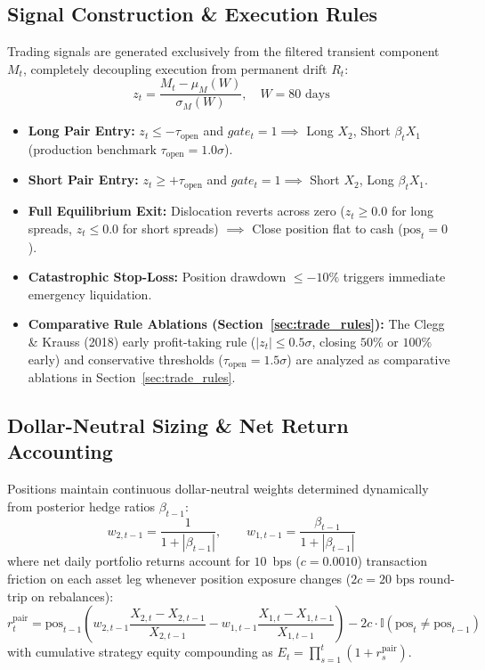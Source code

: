 \documentclass[11pt, a4paper]{article}
\begin{document}
\subsection{Signal Construction \& Execution Rules}
Trading signals are generated exclusively from the filtered transient component $M_t$, completely decoupling execution from permanent drift $R_t$:
\begin{equation}
    z_t = \frac{M_t - \mu_M(W)}{\sigma_M(W)}, \quad W = 80\text{ days}
\end{equation}
\begin{itemize}
    \item \textbf{Long Pair Entry:} $z_t \le -\tau_{\text{open}}$ and $gate_t = 1 \implies$ Long $X_2$, Short $\beta_t X_1$ (production benchmark $\tau_{\text{open}} = 1.0\sigma$).
    \item \textbf{Short Pair Entry:} $z_t \ge +\tau_{\text{open}}$ and $gate_t = 1 \implies$ Short $X_2$, Long $\beta_t X_1$.
    \item \textbf{Full Equilibrium Exit:} Dislocation reverts across zero ($z_t \ge 0.0$ for long spreads, $z_t \le 0.0$ for short spreads) $\implies$ Close position flat to cash ($\text{pos}_t = 0$).
    \item \textbf{Catastrophic Stop-Loss:} Position drawdown $\le -10\%$ triggers immediate emergency liquidation.
    \item \textbf{Comparative Rule Ablations (Section~\ref{sec:trade_rules}):} The Clegg \& Krauss (2018) early profit-taking rule ($|z_t| \le 0.5\sigma$, closing $50\%$ or $100\%$ early) and conservative thresholds ($\tau_{\text{open}} = 1.5\sigma$) are analyzed as comparative ablations in Section~\ref{sec:trade_rules}.
\end{itemize}

\subsection{Dollar-Neutral Sizing \& Net Return Accounting}
Positions maintain continuous dollar-neutral weights determined dynamically from posterior hedge ratios $\beta_{t-1}$:
\begin{equation}
    w_{2,t-1} = \frac{1}{1 + |\beta_{t-1}|}, \qquad w_{1,t-1} = \frac{\beta_{t-1}}{1 + |\beta_{t-1}|}
\end{equation}
where net daily portfolio returns account for $10$~bps ($c = 0.0010$) transaction friction on each asset leg whenever position exposure changes ($2c = 20\text{ bps}$ round-trip on rebalances):
\begin{equation}
    r_t^{\text{pair}} = \text{pos}_{t-1} \left( w_{2,t-1} \frac{X_{2,t} - X_{2,t-1}}{X_{2,t-1}} - w_{1,t-1} \frac{X_{1,t} - X_{1,t-1}}{X_{1,t-1}} \right) - 2c \cdot \mathbb{I}(\text{pos}_t \ne \text{pos}_{t-1})
\end{equation}
with cumulative strategy equity compounding as $E_t = \prod_{s=1}^t (1 + r_s^{\text{pair}})$.
\end{document}
